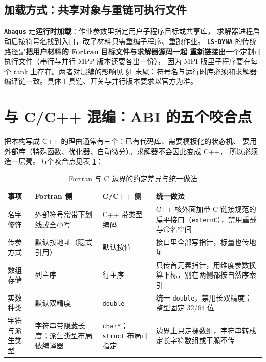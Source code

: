 \documentclass[12pt,a4paper,fontset=fandol]{ctexbook}
\newcommand{\Tp}[1]{\texttt{#1}}
\newcommand{\Bk}{\discretionary{}{}{}}
\newcommand{\Lib}[1]{\textbf{\texttt{#1}}}
\newcommand{\Lang}[1]{\textsf{#1}}
\newcommand{\CL}{\Lang{C}}
\newcommand{\CPP}{\Lang{C++}}
\begin{document}
\subsection{加载方式：共享对象与重链可执行文件}
\label{sec:ch05-loading}

\Lib{Abaqus} 走\textbf{运行时加载}：作业参数里指定用户子程序目标或共享库，
求解器进程启动后按符号名找到入口，改了材料只需重编子程序、重跑作业。
\Lib{LS-DYNA} 的传统路径是\textbf{把用户材料的 Fortran 目标文件与求解器源码一起
重新链接}出一个定制可执行文件（串行与并行 MPP 版本还要各出一份），
因为 MPI 版里子程序要在每个 rank 上存在。两者对混编的影响见 \S\ref{sec:ch05-cpp-shell}
末尾：符号名与运行时库必须和求解器编译链一致。具体工具链、开关与并行版本要求以官方为准。

\section{与 \CL{}/\CPP{} 混编：ABI 的五个咬合点}
\label{sec:ch05-cpp-shell}

把本构写成 \CPP{} 的理由通常有三个：已有代码库、需要模板化的状态机、
要用外部库（特殊函数、优化器、自动微分）。求解器不会因此变成 \CPP{}，
所以必须造一层壳。五个咬合点见表 \ref{tab:ch05-abi}：
\begin{table}[htbp]
\centering
\caption{Fortran 与 \CL{} 边界的约定差异与统一做法}
\label{tab:ch05-abi}
\begin{tabular}{>{\raggedright\arraybackslash}p{}>{\raggedright\arraybackslash}p{}>{\raggedright\arraybackslash}p{}>{\raggedright\arraybackslash}p{}}
\toprule
事项 & Fortran 侧 & \CL{}/{\Bk}\CPP{} 侧 & 统一做法 \\
\midrule
名字修饰 & 外部符号常带下划线或全小写 & \CPP{} 带类型编码 & C++ 核外面加带 \CL{} 链接规范的扁平接口（\Tp{extern\textquotedbl C\textquotedbl}），禁用重载与命名空间 \\
传参方式 & 默认按地址（隐式引用） & 默认按值 & 接口里全部写指针，标量也传地址 \\
数组存储 & 列主序 & 行主序 & 只传首元素指针，用维度参数换算下标，别在两侧都按自然序索引 \\
实数种类 & 默认双精度 & \Tp{double} & 统一 \Tp{double}，禁用长双精度；整型固定 32/64 位 \\
字符与派生类型 & 字符串带隐藏长度；派生类型布局依编译器 & \Tp{char*}；\Tp{struct} 布局可指定 & 边界上只走裸数组，字符串转成定长字符数组或干脆不传 \\
\bottomrule
\end{tabular}
\end{table}
\end{document}

